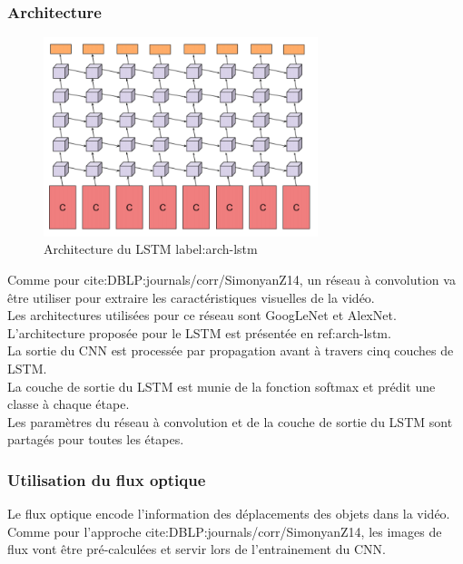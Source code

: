\documentclass[11pt]{article}
\begin{document}
\subsubsection{Architecture}
\label{sec:org33f7e8d}
\begin{figure}[htbp]
\centering
\includegraphics[width=8cm]{cnn_lstm.PNG}
\caption{Architecture du LSTM label:arch-lstm}
\end{figure}
Comme pour cite:DBLP:journals/corr/SimonyanZ14, un réseau à convolution va être utiliser pour extraire les caractéristiques visuelles de la vidéo.\\
Les architectures utilisées pour ce réseau sont GoogLeNet et AlexNet.\\

L'architecture proposée pour le LSTM est présentée en ref:arch-lstm.\\
La sortie du CNN est processée par propagation avant à travers cinq couches de LSTM.\\
La couche de sortie du LSTM est munie de la fonction softmax et prédit une classe à chaque étape.\\
Les paramètres du réseau à convolution et de la couche de sortie du LSTM sont partagés pour toutes les étapes.\\

\subsubsection{Utilisation du flux optique}
\label{sec:org91f23a8}
Le flux optique encode l'information des déplacements des objets dans la vidéo.\\
Comme pour l'approche cite:DBLP:journals/corr/SimonyanZ14, les images de flux vont être pré-calculées et servir lors de l'entrainement du CNN.\\
\end{document}
